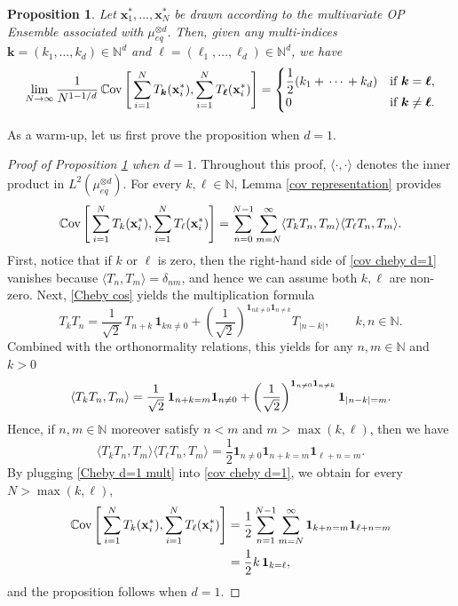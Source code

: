 \documentclass[a4paper,11pt]{article}
\numberwithin{equation}{section}
\newtheorem{proposition}[]{Proposition}
\theoremstyle{definition}
\newcommand{\eq}{\begin{equation}}
\newcommand{\qe}{\end{equation}}
\newcommand{\N}{\mathbb{N}}
\newcommand{\bs}{\boldsymbol}
\newcommand{\bv}{\mathbf}
\newcommand{\mueqd}{\mu_{eq}^{\otimes d}}
\begin{document}
\begin{proposition}
\label{cov cheby prop}
Let $\bv x_1^*,\ldots,\bv x_N^*$ be drawn according to the multivariate OP
Ensemble associated with $\mueqd$. Then, given any multi-indices $\bs k=(k_1,\ldots,k_d)\in\N^d$ and $\bs \ell=(\ell_1,\ldots,\ell_d)\in\N^d$, we have
 \[
\lim_{N\rightarrow\infty}\frac{1}{N^{1-1/d}}\,\mathbb C{\rm ov}\left[\,\sum_{i=1}^NT_{\bs k}(\bv x_i^*),\sum_{i=1}^NT_{\bs \ell}(\bv x_i^*)\right]=\begin{cases} \displaystyle
\frac{1}{2}(k_1+\,\cdots\,+k_d) & \mbox{if }\bs k = \bs\ell,\\
\displaystyle 0 & \mbox{if } \bs k\neq \bs \ell.
 \end{cases}
\]
\end{proposition}

As a warm-up, let us first prove the proposition when $d=1$.

\begin{proof}[Proof of Proposition \ref{cov cheby prop} when $d=1$] Throughout
  this proof, $\langle \cdot,\cdot\rangle$ denotes the inner product in
  $L^2(\mueqd)$. For every $k,\ell\in\N$, Lemma \ref{cov representation} provides
\eq
\label{cov cheby d=1}
\mathbb C{\rm ov}\left[\,\sum_{i=1}^NT_{ k}(\bv x_i^*),\sum_{i=1}^NT_{ \ell}(\bv x_i^*)\right]=\sum_{n=0}^{N-1}\sum_{m=N}^\infty \langle T_{ k}T_{ n},T_{ m}\rangle\langle T_{ \ell}T_{ n},T_{ m}\rangle.
\qe
First, notice that if $k$ or $\ell$ is zero, then the right-hand side of \eqref{cov cheby d=1} vanishes because $\langle T_n,T_m\rangle=\delta_{nm}$, and hence we can assume both $k,\ell$ are non-zero.  Next,  \eqref{Cheby cos}  yields the multiplication formula
\eq
\label{product Cheby}
T_kT_n=\frac{1}{\sqrt 2}\, T_{n+k}\,\bv 1_{kn\neq 0}+ \left(\frac{1}{\sqrt{2}}\right)^{\bv 1_{nk\neq 0}\bv 1_{n\neq k}}T_{|n-k|},\qquad  k,n\in\N.
\qe
Combined with the orthonormality relations, this yields for any $n,m\in\N$  and $k>0$
\eq
\label{product Cheby 2}
\langle T_{ k}T_{ n},T_{ m}\rangle\\
= \frac 1{\sqrt 2} \, \bs 1_{n+k=m}\bs 1_{n\neq 0}+\left(\frac{1}{\sqrt 2}\right)^{\bs 1_{n\neq 0}\bs 1_{n\neq k}} \bs 1_{|n-k|=m}.
\qe
Hence, if $n,m\in\N$  moreover  satisfy $n<m$ and $m>\max(k,\ell)$, then we have
\eq
\label{Cheby d=1 mult}
\langle T_{ k}T_{ n},T_{ m}\rangle\langle T_{ \ell}T_{ n},T_{ m}\rangle=  \frac{1}{2} \bs 1_{n\neq0} \bs 1_{n+k=m}\bs 1_{\ell+n=m}.
\qe
By plugging \eqref{Cheby d=1 mult} into \eqref{cov cheby d=1},  we obtain  for every $N> \max(k,\ell)$,
\begin{align*}
\mathbb C{\rm ov}\left[\,\sum_{i=1}^NT_{ k}(\bv x_i^*),\sum_{i=1}^NT_{ \ell}(\bv x_i^*)\right]
& =\frac 12 \sum_{n=1}^{N-1}\sum_{m=N}^\infty\bs 1_{k+n=m}\bs 1_{\ell+n=m}\\
&  = \frac 12 k \, \bs 1_{k= \ell},
 \end{align*}
and the proposition follows when $d=1$.
\end{proof}
\end{document}

